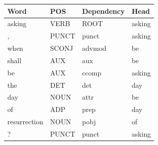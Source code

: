 \begin{tabular}{llll}
\toprule
Word & POS & Dependency & Head \\
\midrule
asking & VERB & ROOT & asking \\
, & PUNCT & punct & asking \\
when & SCONJ & advmod & be \\
shall & AUX & aux & be \\
be & AUX & ccomp & asking \\
the & DET & det & day \\
day & NOUN & attr & be \\
of & ADP & prep & day \\
resurrection & NOUN & pobj & of \\
? & PUNCT & punct & asking \\
\bottomrule
\end{tabular}
